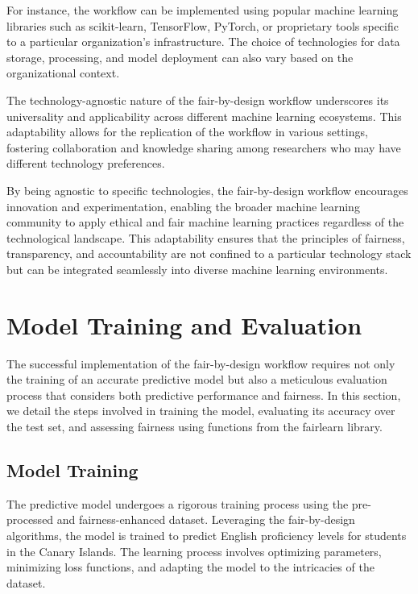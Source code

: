 \documentclass[12pt,a4paper,openright,twoside]{book}
\begin{document}
For instance, the workflow can be implemented using popular machine learning libraries such as scikit-learn, TensorFlow, PyTorch, or proprietary tools specific to a particular organization's infrastructure. The choice of technologies for data storage, processing, and model deployment can also vary based on the organizational context.

The technology-agnostic nature of the fair-by-design workflow underscores its universality and applicability across different machine learning ecosystems. This adaptability allows for the replication of the workflow in various settings, fostering collaboration and knowledge sharing among researchers who may have different technology preferences.

By being agnostic to specific technologies, the fair-by-design workflow encourages innovation and experimentation, enabling the broader machine learning community to apply ethical and fair machine learning practices regardless of the technological landscape. This adaptability ensures that the principles of fairness, transparency, and accountability are not confined to a particular technology stack but can be integrated seamlessly into diverse machine learning environments.

\section{Model Training and Evaluation}

The successful implementation of the fair-by-design workflow requires not only the training of an accurate predictive model but also a meticulous evaluation process that considers both predictive performance and fairness. In this section, we detail the steps involved in training the model, evaluating its accuracy over the test set, and assessing fairness using functions from the fairlearn library.

\subsection{Model Training}

The predictive model undergoes a rigorous training process using the pre-processed and fairness-enhanced dataset. Leveraging the fair-by-design algorithms, the model is trained to predict English proficiency levels for students in the Canary Islands. The learning process involves optimizing parameters, minimizing loss functions, and adapting the model to the intricacies of the dataset.
\end{document}

